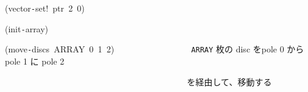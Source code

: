 \documentclass[a4paper,10pt]{article}
\def\mc{\relax}
\begin{document}
\noindent
\mbox{}(vector{\tt -}set!{\tt\mc \ }ptr{\tt\mc \ }2{\tt\mc \ }0)

\noindent
\mbox{}\hfill

\noindent
\mbox{}(init{\tt -}array)

\noindent
\mbox{}(move{\tt -}discs{\tt\mc \ }ARRAY{\tt\mc \ }0{\tt\mc \ }1{\tt\mc \ }2){\tt\mc \ }{\tt\mc \ }{\tt\mc \ }{\tt\mc \ }{\tt\mc \ }{\tt\mc \ }{\tt\mc \ }{\tt\mc \ }{\tt\mc \ }{\tt\mc \ }{\tt\mc \ }{\tt\mc \ }{\tt\mc \ }{\tt\mc \ }{\tt\mc \ }{\tt\mc \ }\rm\mc {\tt ;} \ {\tt ARRAY} 枚の disc をpole 0 から pole 1 に pole 2\hfill
\tt\mc 

\noindent
\mbox{}{\tt\mc \ }{\tt\mc \ }{\tt\mc \ }{\tt\mc \ }{\tt\mc \ }{\tt\mc \ }{\tt\mc \ }{\tt\mc \ }{\tt\mc \ }{\tt\mc \ }{\tt\mc \ }{\tt\mc \ }{\tt\mc \ }{\tt\mc \ }{\tt\mc \ }{\tt\mc \ }{\tt\mc \ }{\tt\mc \ }{\tt\mc \ }{\tt\mc \ }{\tt\mc \ }{\tt\mc \ }{\tt\mc \ }{\tt\mc \ }{\tt\mc \ }{\tt\mc \ }{\tt\mc \ }{\tt\mc \ }{\tt\mc \ }{\tt\mc \ }{\tt\mc \ }{\tt\mc \ }{\tt\mc \ }{\tt\mc \ }{\tt\mc \ }{\tt\mc \ }{\tt\mc \ }{\tt\mc \ }{\tt\mc \ }{\tt\mc \ }\rm\mc {\tt ;} \ を経由して、移動する \hfill

\tt\mc 

\rm\mc
\end{document}
